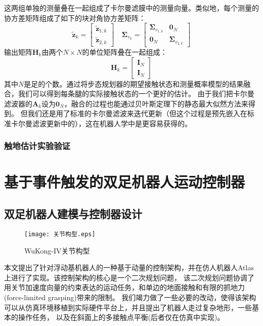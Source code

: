 这两组单独的测量叠在一起组成了卡尔曼滤膜中的测量向量。类似地，每个测量的协方差矩阵组成了如下的块对角协方差矩阵：
\begin{equation}
    \label{equ:est_h_and_f}
    \tilde{\boldsymbol{z}}_k=\left[\begin{array}{c}
        \tilde{\boldsymbol{z}}_{1, k} \\
        \tilde{\boldsymbol{z}}_{2, k}
        \end{array}\right] \quad \boldsymbol{\Sigma}_{v_k}=\left[\begin{array}{cc}
        \boldsymbol{\Sigma}_{v_{1, k}} & \mathbf{0}_N \\
        \mathbf{0}_N & \boldsymbol{\Sigma}_{v_{2, k}}
        \end{array}\right]
\end{equation}
输出矩阵$\boldsymbol{H}_k$由两个$N\times N$的单位矩阵叠在一起组成：
\begin{equation}
    \label{equ:output_matrix}
    \boldsymbol{H}_k=\left[\begin{array}{l}
        \mathbf{I}_N \\
        \mathbf{I}_N
        \end{array}\right]
\end{equation}
其中$N$是足的个数。通过将步态规划器的期望接触状态和测量概率模型的结果融合，我们可以得到每条腿的实际接触状态的一个更好的估计。
由于我们把卡尔曼滤波器的$\boldsymbol{A}_k$设为$\mathbf{0}_N$，融合的过程也能通过贝叶斯定理下的静态最大似然方法来得到。
但我们还是用了标准的卡尔曼滤波来迭代更新（但这个过程是预先嵌入在标准卡尔曼滤波更新中的），这在机器人学中是更容易获得的。

\subsection{触地估计实验验证}

\chapter{基于事件触发的双足机器人运动控制器}
\section{双足机器人建模与控制器设计}
\begin{figure}[htbp]
    \centering
    \texttt{[image: 关节构型.eps]}
    \caption{\label{fig:centroid}WuKong-IV关节构型}
\end{figure}
本文提出了针对浮动基机器人的一种基于动量的控制架构，并在仿人机器人Atlas上进行了实现。该控制架构的核心是一个二次规划问题，
该二次规划问题协调了用关节加速度向量的约束表达的运动任务，和单边的地面接触和有限的抓地力(force-limited grasping)带来的限制。
我们竭力做了一些必要的改动，使得该架构可以从仿真环境移植到实际硬件平台上，并且提出了机器人走过复杂地形，一些基本的操作任务，
以及在斜面上的多接触点平衡(后者仅在仿真中实现)。
